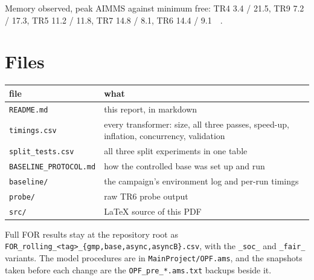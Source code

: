 \documentclass[11pt,a4paper]{article}
\begin{document}
Memory observed, peak AIMMS against minimum free: TR4 3.4 / 21.5, TR9 7.2 / 17.3,
TR5 11.2 / 11.8, TR7 14.8 / 8.1, TR6 14.4 / \SI{9.1}{\giga\byte}.

\section{Files}

\begin{center}
\begin{tabular}{@{}p{} p{}@{}}
\toprule
\textbf{file} & \textbf{what} \\
\midrule
\texttt{README.md} & this report, in markdown \\
\texttt{timings.csv} & every transformer: size, all three passes, speed-up, inflation, concurrency, validation \\
\texttt{split\_tests.csv} & all three split experiments in one table \\
\texttt{BASELINE\_PROTOCOL.md} & how the controlled base was set up and run \\
\texttt{baseline/} & the campaign's environment log and per-run timings \\
\texttt{probe/} & raw TR6 probe output \\
\texttt{src/} & \LaTeX{} source of this PDF \\
\bottomrule
\end{tabular}
\end{center}

Full FOR results stay at the repository root as
\texttt{FOR\_rolling\_<tag>\_\{gmp,base,async,asyncB\}.csv}, with the
\texttt{\_soc\_} and \texttt{\_fair\_} variants. The model procedures are in
\texttt{MainProject/OPF.ams}, and the snapshots taken before each change are the
\texttt{OPF\_pre\_*.ams.txt} backups beside it.
\end{document}
